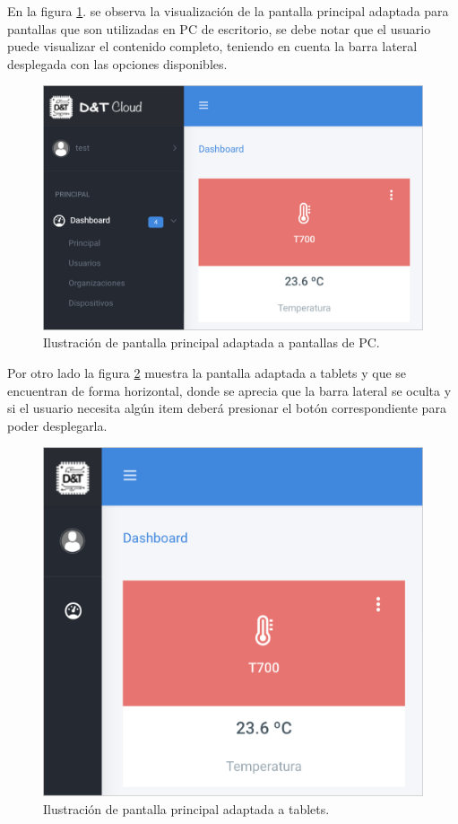En la figura \ref{fig:pantalla-pc}. se observa la visualización de la pantalla principal adaptada para pantallas que son utilizadas en PC de escritorio, se debe notar que el usuario puede visualizar el contenido completo, teniendo en cuenta la barra lateral desplegada con las opciones disponibles. 
\pagebreak
\begin{figure}[htpb]
	\centering
	\includegraphics[scale=.68]{./Figures/pantalla-pc.png}
	\caption[Pantalla adaptada a pantallas para PC]{Ilustración de pantalla principal adaptada a pantallas de PC.}
	\label{fig:pantalla-pc}
\end{figure}



Por otro lado la figura \ref{fig:pantalla-tablet} muestra la pantalla adaptada a tablets y que se encuentran de forma horizontal, donde se aprecia que la barra lateral se oculta y si el usuario necesita algún item deberá presionar el botón correspondiente para poder desplegarla. 

\begin{figure}[htpb]
	\centering
	\includegraphics[scale=.55]{./Figures/pantalla-tablet.png}
	\caption[Pantalla adaptada a tablets]{Ilustración de pantalla principal adaptada a tablets.}
	\label{fig:pantalla-tablet}
\end{figure}

